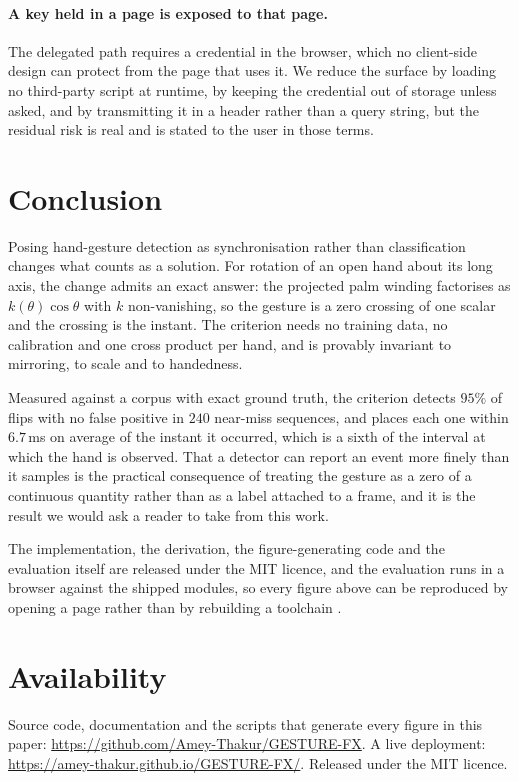\documentclass{article}
\theoremstyle{definition}
\begin{document}
\paragraph{A key held in a page is exposed to that page.}
The delegated path requires a credential in the browser, which no client-side
design can protect from the page that uses it. We reduce the surface by loading
no third-party script at runtime, by keeping the credential out of storage unless
asked, and by transmitting it in a header rather than a query string, but the
residual risk is real and is stated to the user in those terms.

\section{Conclusion}
\label{sec:conclusion}

Posing hand-gesture detection as synchronisation rather than classification
changes what counts as a solution. For rotation of an open hand about its long
axis, the change admits an exact answer: the projected palm winding factorises as
$k(\theta)\cos\theta$ with $k$ non-vanishing, so the gesture is a zero crossing of
one scalar and the crossing is the instant. The criterion needs no training data,
no calibration and one cross product per hand, and is provably invariant to
mirroring, to scale and to handedness.

Measured against a corpus with exact ground truth, the criterion detects
$95\%$ of flips with no false positive in $240$ near-miss sequences, and places
each one within $6.7$\,ms on average of the instant it occurred, which is a sixth
of the interval at which the hand is observed. That a detector can report an
event more finely than it samples is the practical consequence of treating the
gesture as a zero of a continuous quantity rather than as a label attached to a
frame, and it is the result we would ask a reader to take from this work.

The implementation, the derivation, the figure-generating code and the evaluation
itself are released under the MIT licence, and the evaluation runs in a browser
against the shipped modules, so every figure above can be reproduced by opening a
page rather than by rebuilding a toolchain \citep{thakur2026gesturefx}.

\section*{Availability}

Source code, documentation and the scripts that generate every figure in this
paper: \url{https://github.com/Amey-Thakur/GESTURE-FX}. A live deployment:
\url{https://amey-thakur.github.io/GESTURE-FX/}. Released under the MIT licence.



\end{document}
